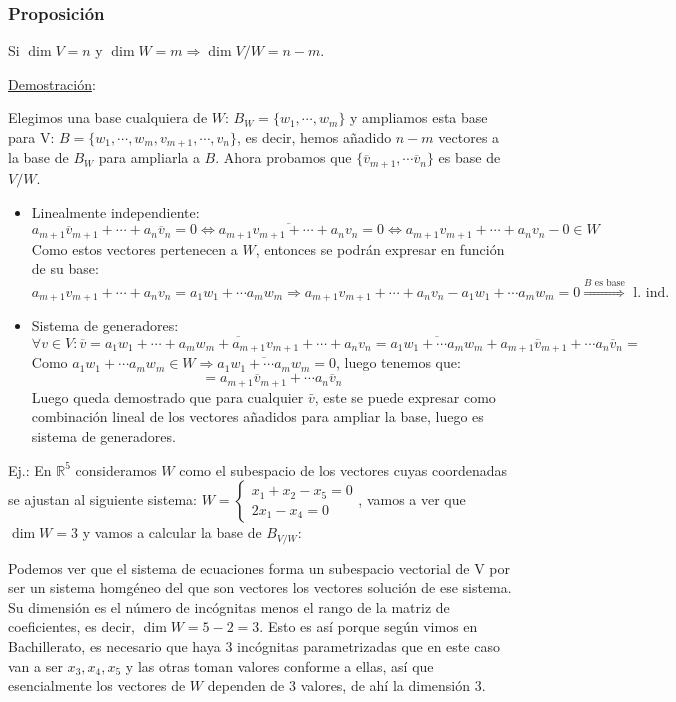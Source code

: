 \documentclass[10pt,a4paper,openright]{book}
\begin{document}
\subsubsection*{Proposición}
Si $\dim V=n$ y $\dim W=m\Rightarrow \dim V/W=n-m$.

\underline{Demostración}:\par
Elegimos una base cualquiera de $W$: $B_W=\{w_1,\cdots,w_m\}$ y ampliamos esta base para V: $B=\{w_1,\cdots, w_m, v_{m+1}, \cdots, v_n\}$, es decir, hemos añadido $n-m$ vectores a la base de $B_W$ para ampliarla a $B$. Ahora probamos que $\{\overline{v}_{m+1},\cdots \overline{v}_n\}$ es base de $V/W$.

\begin{itemize}
\item Linealmente independiente:
$$a_{m+1}\overline{v}_{m+1}+\cdots +a_n\overline{v}_n=0\Leftrightarrow \overline{a_{m+1}v_{m+1}+\cdots +a_nv_n}=0\Leftrightarrow a_{m+1}v_{m+1}+\cdots +a_nv_n- 0\in W$$
Como estos vectores pertenecen a $W$, entonces se podrán expresar en función de su base:
$$a_{m+1}v_{m+1}+\cdots +a_nv_n=a_1w_1+\cdots a_mw_m\Rightarrow a_{m+1}v_{m+1}+\cdots +a_nv_n-a_1w_1+\cdots a_mw_m=0\stackrel{B\mbox{ es base}}{\Rightarrow}\mbox{ l. ind.}$$

\item Sistema de generadores:
$$\forall v\in V: \overline{v}=\overline{a_1w_1+\cdots+a_mw_m+a_{m+1}v_{m+1}+\cdots+ a_nv_n}=\overline{a_1w_1+\cdots a_mw_m}+a_{m+1}\overline{v}_{m+1}+\cdots a_n\overline{v}_n=$$
Como $a_1w_1+\cdots a_mw_m\in W\Rightarrow \overline{a_1w_1+\cdots a_mw_m}=0$, luego tenemos que:
$$=a_{m+1}\overline{v}_{m+1}+\cdots a_n\overline{v}_n$$
Luego queda demostrado que para cualquier $\bar{v}$, este se puede expresar como combinación lineal de los vectores añadidos para ampliar la base, luego es sistema de generadores.

\end{itemize}

Ej.: En $\mathbb R^5$ consideramos $W$ como el subespacio de los vectores cuyas coordenadas se ajustan al siguiente sistema: $W=\begin{cases}
x_1+x_2-x_5=0 \\
2x_1-x_4=0
\end{cases}$, vamos a ver que $\dim W=3$ y vamos a calcular la base de $B_{V/W}$:\par
Podemos ver que el sistema de ecuaciones forma un subespacio vectorial de V por ser un sistema homgéneo del que son vectores los vectores solución de ese sistema. Su dimensión es el número de incógnitas menos el rango de la matriz de coeficientes, es decir, $\dim W=5-2=3$. Esto es así porque según vimos en Bachillerato, es necesario que haya 3 incógnitas parametrizadas que en este caso van a ser $x_3, x_4, x_5$ y las otras toman valores conforme a ellas, así que esencialmente los vectores de $W$ dependen de 3 valores, de ahí la dimensión 3.
\end{document}
